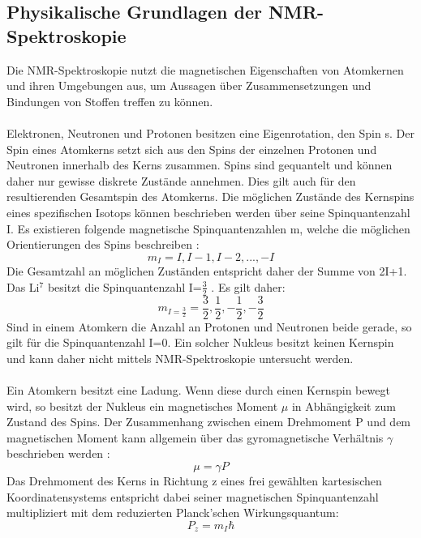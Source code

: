 \documentclass[a4paper, 11pt, headsepline,footsepline,twoside,abstract]{scrbook}
\begin{document}
\subsection{Physikalische Grundlagen der NMR-Spektroskopie}
Die NMR-Spektroskopie nutzt die magnetischen Eigenschaften von Atomkernen und ihren Umgebungen aus, um Aussagen über Zusammensetzungen und Bindungen von Stoffen treffen zu können.
\\\\
Elektronen, Neutronen und Protonen besitzen eine Eigenrotation, den Spin s. Der Spin eines Atomkerns setzt sich aus den Spins der einzelnen Protonen und Neutronen innerhalb des Kerns zusammen. Spins sind gequantelt und können daher nur gewisse diskrete Zustände annehmen. Dies gilt auch für den resultierenden Gesamtspin des Atomkerns. Die möglichen Zustände des Kernspins eines spezifischen Isotops können beschrieben werden über seine Spinquantenzahl I. Es existieren folgende magnetische Spinquantenzahlen m, welche die möglichen Orientierungen des Spins beschreiben \cite{Gerthsen2015}:
\begin{equation}
m_I = I, I-1, I-2, ..., -I
\end{equation}
Die Gesamtzahl an möglichen Zuständen entspricht daher der Summe von 2I+1. Das Li$^7$ besitzt die Spinquantenzahl I=$\frac{3}{2}$ \cite{Fitzgerald1999}. Es gilt daher:
\begin{equation}
m_{I=\frac{3}{2}} = \frac{3}{2}, \frac{1}{2}, -\frac{1}{2}, -\frac{3}{2}
\end{equation}
Sind in einem Atomkern die Anzahl an Protonen und Neutronen beide gerade, so gilt für die Spinquantenzahl I=0. Ein solcher Nukleus besitzt keinen Kernspin und kann daher nicht mittels NMR-Spektroskopie untersucht werden.
\\\\
Ein Atomkern besitzt eine Ladung. Wenn diese durch einen Kernspin bewegt wird, so besitzt der Nukleus ein magnetisches Moment $\mu$ in Abhängigkeit zum Zustand des Spins. Der Zusammenhang zwischen einem Drehmoment P und dem magnetischen Moment kann allgemein über das gyromagnetische Verhältnis $\gamma$ beschrieben werden \cite{Guenther2013}: 
\begin{equation}
\mu = \gamma P
\end{equation}
Das Drehmoment des Kerns in Richtung z eines frei gewählten kartesischen Koordinatensystems entspricht dabei seiner magnetischen Spinquantenzahl multipliziert mit dem reduzierten Planck'schen Wirkungsquantum:
\begin{equation}
P_z = m_I \hbar
\label{magnMoment}
\end{equation}
\end{document}
